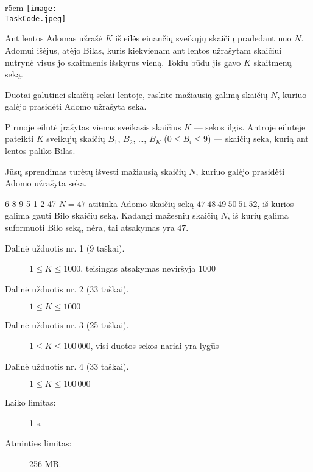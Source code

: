 \documentclass{boi2014-lt}
\renewcommand{\TaskCode}{sequence}
\begin{document}
    \begin{wrapfigure}[5]{r}{5cm}
        \vspace{-24pt}
		\texttt{[image: \\TaskCode.jpeg]}
	\end{wrapfigure}

    Ant lentos Adomas užrašė $K$ iš eilės einančių sveikųjų skaičių pradedant
    nuo $N$. Adomui išėjus, atėjo Bilas, kuris kiekvienam ant lentos užrašytam
    skaičiui nutrynė visus jo skaitmenis išskyrus vieną. Tokiu būdu jis gavo
    $K$ skaitmenų seką.

    \Task
    Duotai galutinei skaičių sekai lentoje, raskite mažiausią galimą skaičių $N$,
    kuriuo galėjo prasidėti Adomo užrašyta seka.

    \Input
    Pirmoje eilutė įrašytas vienas sveikasis skaičius $K$ --- sekos ilgis. Antroje
    eilutėje pateikti $K$ sveikųjų skaičių
    $B_1$, $B_2$, \dots, $B_K$ ($0 \le B_i \le 9$) --- skaičių seka, kurią ant
    lentos paliko Bilas.

    \Output
    Jūsų sprendimas turėtų išvesti mažiausią skaičių $N$, kuriuo galėjo prasidėti
    Adomo užrašyta seka.

    \Example

    \example
    {
        6 8 9 5 1 2
    }
    {
        47
    }
    {
        $N = 47$ atitinka Adomo skaičių seką $47\ 48\ 49\ 50\ 51\ 52$, iš kurios
        galima gauti Bilo skaičių seką. Kadangi mažesnių skaičių $N$, iš kurių
        galima suformuoti Bilo seką, nėra, tai atsakymas yra $47$.
    }

    \Scoring

    \begin{description}
        \item[Dalinė užduotis nr. 1 (9 taškai).] $1 \le K \le 1000$, teisingas atsakymas neviršyja $1000$
        \item[Dalinė užduotis nr. 2 (33 taškai).] $1 \le K \le 1000$
        \item[Dalinė užduotis nr. 3 (25 taškai).] $1 \le K \le 100\,000$, visi duotos sekos nariai yra lygūs
        \item[Dalinė užduotis nr. 4 (33 taškai).] $1 \le K \le 100\,000$
    \end{description}

    \Constraints

    \begin{description}
        \item[Laiko limitas:] 1 s.
        \item[Atminties limitas:] 256 MB.
    \end{description}
\end{document}

